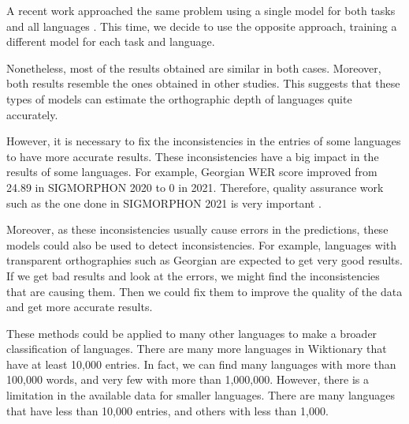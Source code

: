\documentclass[11pt,a4paper]{article}
\begin{document}
A recent work approached the same problem using a single model for both tasks and all languages \cite{marjou2021oteann}. This time, we decide to use the opposite approach, training a different model for each task and language. 

Nonetheless, most of the results obtained are similar in both cases. Moreover, both results resemble the ones obtained in other studies. This suggests that these types of models can estimate the orthographic depth of languages quite accurately.

However, it is necessary to fix the inconsistencies in the entries of some languages to have more accurate results. These inconsistencies have a big impact in the results of some languages. For example, Georgian WER score improved from 24.89 in SIGMORPHON 2020 \cite{gorman-etal-2020-sigmorphon} to 0 in 2021. Therefore, quality assurance work such as the one done in SIGMORPHON 2021 is very important \cite{ashby-etal-2021-results}.

Moreover, as these inconsistencies usually cause errors in the predictions, these models could also be used to detect inconsistencies. For example, languages with transparent orthographies such as Georgian are expected to get very good results. If we get bad results and look at the errors, we might find the inconsistencies that are causing them. Then we could fix them to improve the quality of the data and get more accurate results.

These methods could be applied to many other languages to make a broader classification of languages. There are many more languages in Wiktionary that have at least 10,000 entries. In fact, we can find many languages with more than 100,000 words, and very few with more than 1,000,000. However, there is a limitation in the available data for smaller languages. There are many languages that have less than 10,000 entries, and others with less than 1,000.



\end{document}
